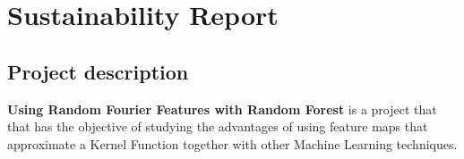 
\chapter{Sustainability Report} %

\label{Chapter6} %




  \section{Project description}

  \textbf{Using Random Fourier Features with Random Forest} is a project that
  that has the objective of studying the advantages of using feature maps that
  approximate a Kernel Function together with other Machine Learning techniques.

